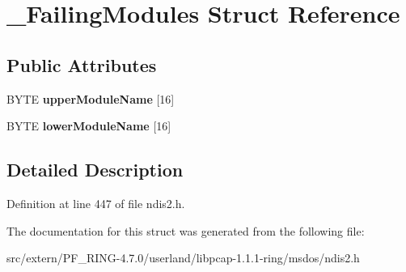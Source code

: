 \hypertarget{struct___failing_modules}{
\section{\_\-FailingModules Struct Reference}
\label{struct___failing_modules}
}
\subsection*{Public Attributes}
\begin{DoxyCompactItemize}
\item 
\hypertarget{struct___failing_modules_a72ce7b7bbbea6f66e8a5273d744f5dd4}{
BYTE {\bfseries upperModuleName} \mbox{[}16\mbox{]}}
\label{struct___failing_modules_a72ce7b7bbbea6f66e8a5273d744f5dd4}

\item 
\hypertarget{struct___failing_modules_a89ce9258b8a2804a277ce2bf0ad47c53}{
BYTE {\bfseries lowerModuleName} \mbox{[}16\mbox{]}}
\label{struct___failing_modules_a89ce9258b8a2804a277ce2bf0ad47c53}

\end{DoxyCompactItemize}


\subsection{Detailed Description}


Definition at line 447 of file ndis2.h.



The documentation for this struct was generated from the following file:\begin{DoxyCompactItemize}
\item 
src/extern/PF\_\-RING-\/4.7.0/userland/libpcap-\/1.1.1-\/ring/msdos/ndis2.h\end{DoxyCompactItemize}

